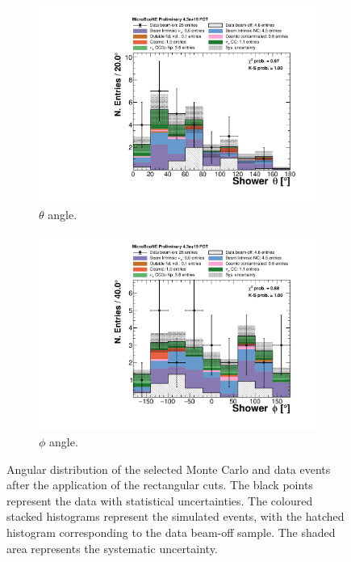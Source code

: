 \begin{figure}
\centering
  \begin{subfigure}{0.48\textwidth}
    \includegraphics[width=\linewidth]{figures/theta_cuts.pdf}
    \caption{$\theta$ angle.} 
  \end{subfigure}
    \begin{subfigure}{0.48\textwidth}
    \includegraphics[width=\linewidth]{figures/phi_cuts.pdf}
    \caption{$\phi$ angle.} 
  \end{subfigure}
  \caption{Angular distribution of the selected Monte Carlo and data events after the application of the rectangular cuts. The black points represent the data with statistical uncertainties. The coloured stacked histograms represent the simulated events, with the hatched histogram corresponding to the data beam-off sample. The shaded area represents the systematic uncertainty.}
  \label{fig:angle_cuts}
\end{figure}

